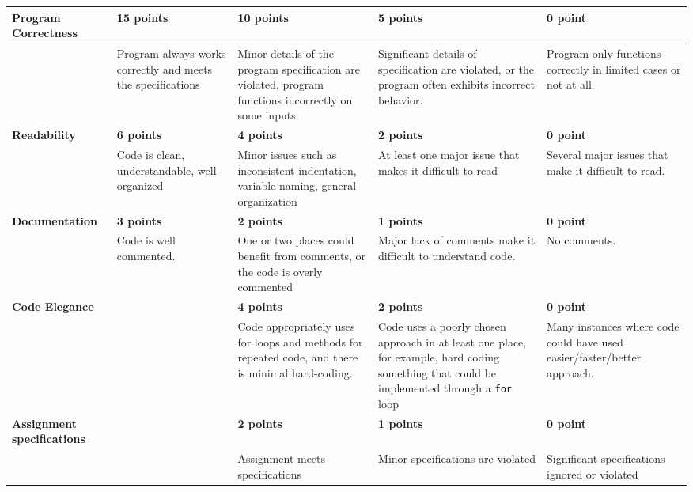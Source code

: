 \documentclass[11pt,landscape]{article}
\begin{document}
{\renewcommand{\arraystretch}{2}
\begin{tabular}{|p{3.3cm}|p{4.2cm}|p{4.2cm}|p{4.2cm}|p{4.2cm}|}
\hline
{\bf Program \newline Correctness } & {\bf 15 points} & {\bf 10 points} & {\bf 5 points} & {\bf 0 point} \\
\hline
& 
 Program always works correctly and meets the specifications& 
 Minor details of the program specification are violated, program functions incorrectly on some inputs.& 
 Significant details of specification are violated, or the program often exhibits incorrect behavior.& 
 Program only functions correctly in limited cases or not at all.\\
\hline
{\bf Readability } & {\bf 6 points} & {\bf 4 points} & {\bf 2 points} & {\bf 0 point} \\
\hline
& 
Code is clean, understandable, well-organized &
Minor issues such as inconsistent indentation, variable naming, general organization & 
At least one major issue that makes it difficult to read & 
Several major issues that make it difficult to read.\\
\hline
{\bf Documentation} & {\bf 3 points}& {\bf 2 points} & {\bf 1 points} & {\bf 0 point} \\
\hline
 &
Code is well commented. 
&
One or two places could benefit from comments, or the code is overly commented
&
Major lack of comments make it difficult to understand code.
&
No comments.\\
\hline
{\bf Code Elegance } & & {\bf 4 points} & {\bf 2 points} & {\bf 0 point} \\
\hline
& &
Code appropriately uses for loops and methods for repeated code, and there is minimal hard-coding. &
Code uses a poorly chosen approach in at least one place, for example, hard coding something that could be implemented through a \texttt{for} loop & 
Many instances where code could have used easier/faster/better approach.\\
\hline
{\bf Assignment specifications} & & {\bf 2 points} & {\bf 1 points} & {\bf 0 point} \\
\hline
 & &
Assignment meets specifications
&
Minor specifications are violated
&
Significant specifications ignored or violated
\\
\hline
 \end{tabular}
}
\end{document}
